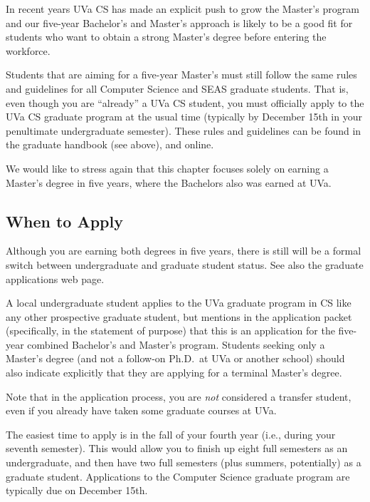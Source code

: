 In recent years UVa CS has made an explicit push to grow the Master's
program and our five-year Bachelor's and Master's approach is likely to
be a good fit for students who want to obtain a strong Master's degree 
before entering the workforce. 

Students that are aiming for a five-year Master's must still follow the
same rules and guidelines for all Computer Science and SEAS graduate
students. That is, even though you are ``already'' a UVa CS student, you
must officially apply to the UVa CS graduate program at the usual time
(typically by December 15th in your penultimate undergraduate semester). 
These rules and guidelines can be found in the graduate handbook (see
above), and
online.

We would like to stress again that this chapter focuses solely on
earning a Master's degree in five years, where the Bachelors also was
earned at UVa.

\subsection{When to Apply}

Although you are earning both degrees in five years, there is still will
be a formal switch between undergraduate and graduate student status.
See also the graduate applications web
page.

A local undergraduate student applies to the UVa graduate program in CS
like any other prospective graduate student, but mentions in the
application packet (specifically, in the statement of purpose) that 
this is an application for the five-year combined Bachelor's and Master's
program. Students seeking only a Master's degree (and not a follow-on
Ph.D.\ at UVa or another school) should also indicate explicitly that they
are applying for a terminal Master's degree. 

Note that in the application process, you are \emph{not} considered a
transfer student, even if you already have taken some graduate courses at
UVa.

The easiest time to apply is in the fall of your fourth year (i.e., during
your seventh semester).  This would allow you to finish up eight full
semesters as an undergraduate, and then have two full semesters (plus
summers, potentially) as a graduate student. Applications to the Computer 
Science graduate program are typically due on December
15th. 

